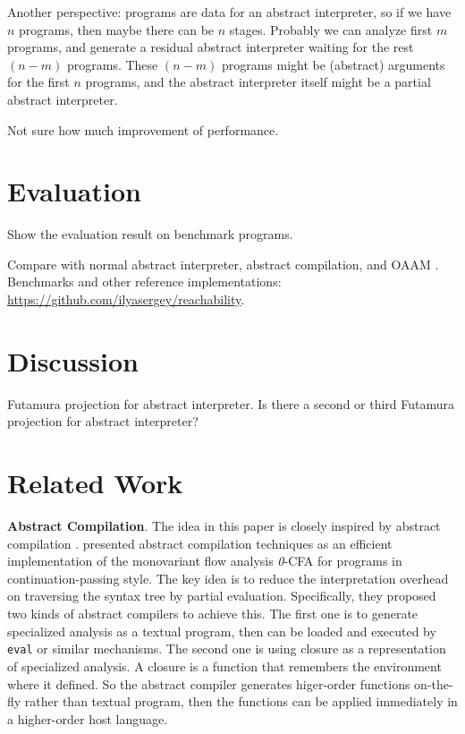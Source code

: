 \documentclass[sigplan,anonymous,review]{acmart}
\begin{document}
Another perspective: programs are data for an abstract interpreter, so if we have $n$ programs, 
then maybe there can be $n$ stages. 
Probably we can analyze first $m$ programs, and generate a residual abstract interpreter
waiting for the rest $(n-m)$ programs.
These $(n-m)$ programs might be (abstract) arguments for the first $n$ programs, and
the abstract interpreter itself might be a partial abstract interpreter.

Not sure how much improvement of performance.

\section{Evaluation}

Show the evaluation result on benchmark programs.

Compare with normal abstract interpreter, 
abstract compilation\cite{Boucher:1996:ACN:647473.727587}, and OAAM \cite{Johnson:2013:OAA:2500365.2500604}.
Benchmarks and other reference implementations: \url{https://github.com/ilyasergey/reachability}.

\section{Discussion}

Futamura projection for abstract interpreter. Is there a second or third Futamura projection for
abstract interpreter?

\section{Related Work}

\textbf{Abstract Compilation}. The idea in this paper is closely inspired by 
abstract compilation \cite{Boucher:1996:ACN:647473.727587}.
\citeauthor{Boucher:1996:ACN:647473.727587} presented abstract compilation
techniques as an efficient implementation of the monovariant flow analysis 
\textit{0}-CFA for programs in continuation-passing style. The key idea is to 
reduce the interpretation overhead on traversing the syntax tree by partial evaluation.
Specifically, they proposed two kinds of abstract compilers to achieve this. 
The first one is to generate specialized analysis as a textual program, then 
can be loaded and executed by \texttt{eval} or similar mechanisms. The second 
one is using closure as a representation of specialized analysis. 
A closure is a function that remembers the environment where it defined. So the 
abstract compiler generates higer-order functions on-the-fly rather than textual 
program, then the functions can be applied immediately in a higher-order host language.
\end{document}
